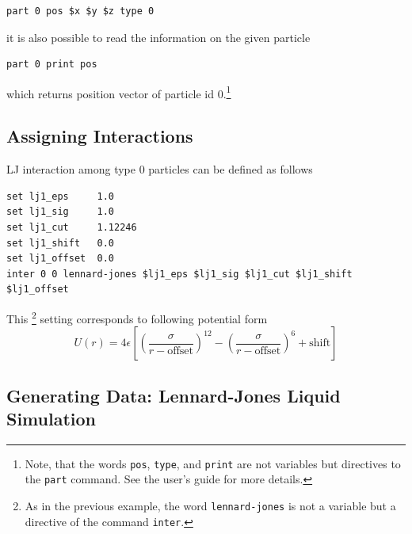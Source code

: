 \documentclass[
paper=a4,                       %
fontsize=11pt,                  %
twoside,                        %
footsepline,                    %
headsepline,                    %
headinclude=false,              %
footinclude=false,              %
pagesize,                       %
]{scrartcl}
\begin{document}
{\small\vspace{0,2cm}
\begin{lstlisting}[numbers=none]
part 0 pos $x $y $z type 0
\end{lstlisting}\vspace{0,2cm}
}

\noindent it is also possible to read the information on the given particle

{\small\vspace{0,2cm}
\begin{lstlisting}[numbers=none]
part 0 print pos
\end{lstlisting}\vspace{0,2cm}
} 

\noindent which returns position vector of particle id 0.\footnote{Note, that the words
\texttt{pos}, \texttt{type}, and \texttt{print} are not variables but
directives to the \lstinline|part| command. See the \es{} user's guide for more details.}
\subsection{Assigning Interactions}  
LJ interaction among type 0 particles can be defined as follows

{\small\vspace{0,2cm}
\begin{lstlisting}[numbers=none]
set lj1_eps     1.0
set lj1_sig     1.0
set lj1_cut     1.12246
set lj1_shift   0.0
set lj1_offset  0.0
inter 0 0 lennard-jones $lj1_eps $lj1_sig $lj1_cut $lj1_shift $lj1_offset
\end{lstlisting}
}\vspace{0,2cm}

\noindent  This \footnote{As in the previous example, the word \texttt{lennard-jones} is not a
variable but a directive of the command \texttt{inter}.}
 setting corresponds to following potential form
 $$U(r)=4 \epsilon\left[ \left(\frac{\sigma}{r-\text{offset}} \right)^{12} - \left(\frac{\sigma}{r-\text{offset}} \right)^{6} + \text{shift}\right] $$



\subsection{Generating Data: Lennard-Jones Liquid Simulation }
\end{document}
